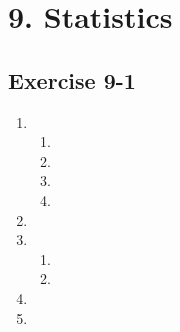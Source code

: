 
\section {9. Statistics}
\subsection{Exercise 9-1} %
\begin{enumerate}[noitemsep, label=\textbf{\arabic*}.]
\item %
\begin{enumerate}[noitemsep, label=\textbf{(\alph*)} ]
 \item %
\item %
\item %
\item %
\end{enumerate}
\item %
\item %
\begin{enumerate}[noitemsep, label=\textbf{(\alph*)} ]
  \item %
  \item %
  \end{enumerate}

\item %

\item %

\end{enumerate}
